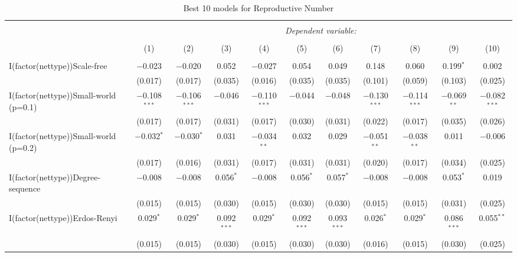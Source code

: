 
\begin{table}[!htbp] \centering 
  \caption{Best 10 models for Reproductive Number} 
  \label{tab:best_models_rep_num} 
\begin{tabular}{@{\extracolsep{5pt}}lcccccccccc} 
\\[-1.8ex]\hline 
\hline \\[-1.8ex] 
 & \multicolumn{10}{c}{\textit{Dependent variable:}} \\ 
\cline{2-11} 
\\[-1.8ex] & (1) & (2) & (3) & (4) & (5) & (6) & (7) & (8) & (9) & (10)\\ 
\hline \\[-1.8ex] 
 I(factor(nettype))Scale-free & $-$0.023 & $-$0.020 & 0.052 & $-$0.027 & 0.054 & 0.049 & 0.148 & 0.060 & 0.199$^{*}$ & 0.002 \\ 
  & (0.017) & (0.017) & (0.035) & (0.016) & (0.035) & (0.035) & (0.101) & (0.059) & (0.103) & (0.025) \\ 
  I(factor(nettype))Small-world (p=0.1) & $-$0.108$^{***}$ & $-$0.106$^{***}$ & $-$0.046 & $-$0.110$^{***}$ & $-$0.044 & $-$0.048 & $-$0.130$^{***}$ & $-$0.114$^{***}$ & $-$0.069$^{**}$ & $-$0.082$^{***}$ \\ 
  & (0.017) & (0.017) & (0.031) & (0.017) & (0.030) & (0.031) & (0.022) & (0.017) & (0.035) & (0.026) \\ 
  I(factor(nettype))Small-world (p=0.2) & $-$0.032$^{*}$ & $-$0.030$^{*}$ & 0.031 & $-$0.034$^{**}$ & 0.032 & 0.029 & $-$0.051$^{**}$ & $-$0.038$^{**}$ & 0.011 & $-$0.006 \\ 
  & (0.017) & (0.016) & (0.031) & (0.017) & (0.031) & (0.031) & (0.020) & (0.017) & (0.034) & (0.025) \\ 
  I(factor(nettype))Degree-sequence & $-$0.008 & $-$0.008 & 0.056$^{*}$ & $-$0.008 & 0.056$^{*}$ & 0.057$^{*}$ & $-$0.008 & $-$0.008 & 0.053$^{*}$ & 0.019 \\ 
  & (0.015) & (0.015) & (0.030) & (0.015) & (0.030) & (0.030) & (0.015) & (0.015) & (0.031) & (0.025) \\ 
  I(factor(nettype))Erdos-Renyi & 0.029$^{*}$ & 0.029$^{*}$ & 0.092$^{***}$ & 0.029$^{*}$ & 0.092$^{***}$ & 0.093$^{***}$ & 0.026$^{*}$ & 0.029$^{*}$ & 0.086$^{***}$ & 0.055$^{**}$ \\ 
  & (0.015) & (0.015) & (0.030) & (0.015) & (0.030) & (0.030) & (0.016) & (0.015) & (0.030) & (0.025) \\ 

\end{tabular}
\end{table}

